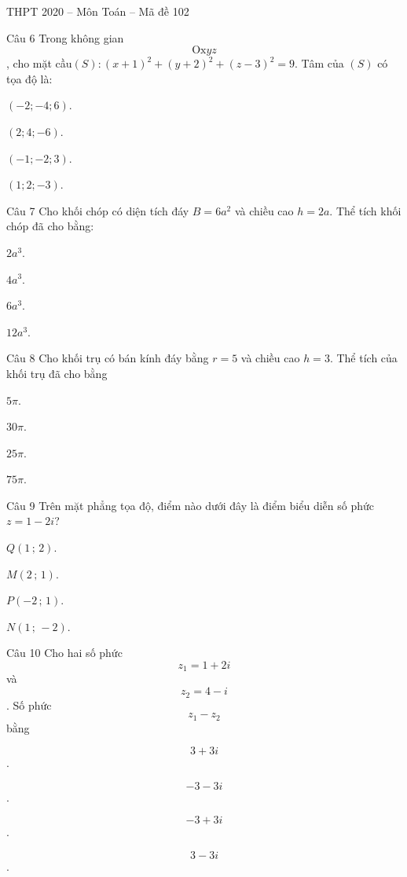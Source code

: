 \documentclass{book}
\begin{document}
\begin{quiz}{THPT 2020 – Môn Toán – Mã đề 102}
\begin{multi}[points=1]{Câu 6}
 Trong không gian \[\text{Ox}yz\], cho mặt cầu$(S):{{(x+1)}^{2}}+{{(y+2)}^{2}}+{{(z-3)}^{2}}=9$. Tâm của $(S)$ có tọa độ là: 

\item  $(-2;-4;6)$.	
\item  $(2;4;-6)$.	
\item*  $(-1;-2;3)$.	
\item  $(1;2;-3)$.
\end{multi}

\begin{multi}[points=1]{Câu 7}
 Cho khối chóp có diện tích đáy $B=6{{a}^{2}}$ và chiều cao $h=2a$. Thể tích khối chóp đã cho bằng: 

\item  $2{{a}^{3}}$.	
\item*  $4{{a}^{3}}$.	
\item  $6{{a}^{3}}$.	
\item  $12{{a}^{3}}$.
\end{multi}

\begin{multi}[points=1]{Câu 8}
 Cho khối trụ có bán kính đáy bằng $r=5$ và chiều cao $h=3$. Thể tích của khối trụ đã cho bằng

\item  $5\pi $.	
\item  $30\pi $.	
\item  $25\pi $.	
\item*  $75\pi $.
\end{multi}

\begin{multi}[points=1]{Câu 9}
 Trên mặt phẳng tọa độ, điểm nào dưới đây là điểm biểu diễn số phức $z=1-2i$?

\item  $Q\left( 1\,;\,2 \right)$.	
\item  $M\left( 2\,;\,1 \right)$.	
\item  $P\left( -2\,;\,1 \right)$.	
\item*  $N\left( 1\,;\,-2 \right)$.
\end{multi}

\begin{multi}[points=1]{Câu 10}
 Cho hai số phức \[{{z}_{1}}=1+2i\] và \[{{z}_{2}}=4-i\]. Số phức \[{{z}_{1}}-{{z}_{2}}\] bằng

\item  \[3+3i\].	
\item  \[-3-3i\].	
\item*  \[-3+3i\].	
\item  \[3-3i\].
\end{multi}


\end{quiz}
\end{document}
